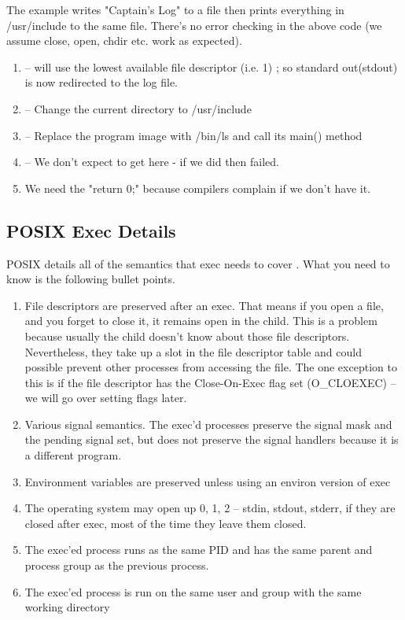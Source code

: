 \begin{itemize}
The example writes "Captain's Log" to a file then prints everything in /usr/include to the same file.
There's no error checking in the above code (we assume close, open, chdir etc. work as expected).

\begin{enumerate}
    \item {} -- will use the lowest available file descriptor (i.e. 1) ; so standard out(stdout) is now redirected to the log file.
    \item {} -- Change the current directory to /usr/include
    \item {} -- Replace the program image with /bin/ls and call its main() method
    \item {} -- We don't expect to get here - if we did then  failed.
    \item We need the "return 0;" because compilers complain if we don't have it.
\end{enumerate}

\subsection{POSIX Exec Details}

POSIX details all of the semantics that exec needs to cover \cite{exec_2018}.
What you need to know is the following bullet points.

\begin{enumerate}
    \item File descriptors are preserved after an exec. That means if you open a file, and you forget to close it, it remains open in the child.
          This is a problem because usually the child doesn't know about those file descriptors. Nevertheless, they take up a slot in the file descriptor table and could possible prevent other processes from accessing the file.
          The one exception to this is if the file descriptor has the Close-On-Exec flag set (O\_CLOEXEC) -- we will go over setting flags later.
    \item Various signal semantics. The exec'd processes preserve the signal mask and the pending signal set, but does not preserve the signal handlers because it is a different program.
    \item Environment variables are preserved unless using an environ version of exec
    \item The operating system may open up 0, 1, 2 -- stdin, stdout, stderr, if they are closed after exec, most of the time they leave them closed.
    \item The exec'ed process runs as the same PID and has the same parent and process group as the previous process.
    \item The exec'ed process is run on the same user and group with the same working directory
\end{enumerate}


\end{itemize}
